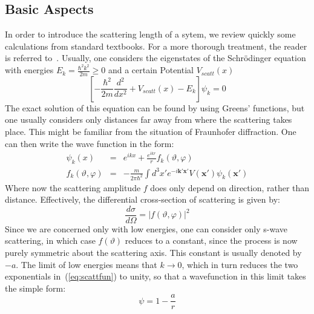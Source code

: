 \subsection{Basic Aspects}
In order to introduce the scattering length of a sytem, we review quickly some calculations from standard textbooks. For a more thorough treatment, the reader is 
referred to~\cite{schwabl}. Usually, one considers the eigenstates of the Schr\"odinger equation with energies $E_k = \frac{\hbar^2k^2}{2m}\geq0$ and a certain 
Potential $V_{scatt}(x)$
\begin{equation}\label{eq:scattering}
	\left[-\frac{\hbar^2}{2m}\frac{d^2}{dx^2} + V_{scatt}(x) - E_k\right]\psi_k=0
\end{equation}
The exact solution of this equation can be found by using Greens' functions, but one usually considers only distances far away from where the scattering takes place. This might be familiar from the situation of Fraunhofer diffraction. One can then write the wave function in the form:
\begin{eqnarray}
	\psi_k(x)&=&e^{ikx} + \frac{e^{ikr}}{r}f_k(\vartheta, \varphi)\label{eq:scattfun}\\
	f_k(\vartheta, \varphi)&=&-\frac{m}{2\pi\hbar^2}\int d^3x'e^{-i\mathbf{k}'\mathbf{x}'}V(\mathbf{x}')
\psi_k(\mathbf{x}')\label{eq:scattampl}
\end{eqnarray}
Where now the scattering amplitude $f$ does only depend on direction, rather than distance. Effectively, the differential cross-section of scattering is given by:
\begin{equation}\label{eq:diffxn}
	\frac{d\sigma}{d\Omega}=|f(\vartheta, \varphi)|^2
\end{equation}
Since we are concerned only with low energies, one can consider only s-wave scattering, in which case $f(\vartheta)$ reduces to a constant, since the process is now purely symmetric about the scattering axis. This constant is usually denoted by $-a$. The limit of low energies means that $k\rightarrow 0$, which in turn reduces the two exponentials in~(\ref{eq:scattfun}) to unity, so that a wavefunction in this limit takes the simple form:
\begin{equation}\label{eq:swavescattfun}
	\psi=1-\frac{a}{r}
\end{equation}

